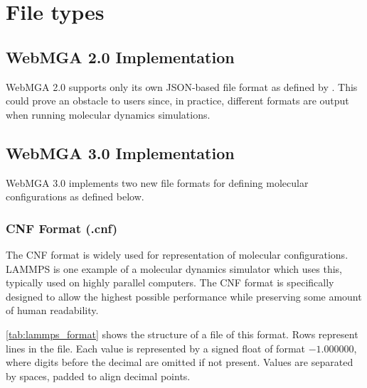 \section{File types}
\subsection{WebMGA 2.0 Implementation}
WebMGA 2.0 supports only its own JSON-based file format as defined by \citeauthor{Battistini_2021}. This could prove an obstacle to users since, in practice, different formats are output when running molecular dynamics simulations.

\subsection{WebMGA 3.0 Implementation}
WebMGA 3.0 implements two new file formats for defining molecular configurations as defined below.
\subsubsection{CNF Format (.cnf)}
The CNF format is widely used for representation of molecular configurations. LAMMPS is one example of a molecular dynamics simulator which uses this, typically used on highly parallel computers\cite{thompson2022lammps}. The CNF format is specifically designed to allow the highest possible performance while preserving some amount of human readability.

\cref{tab:lammps_format} shows the structure of a file of this format. Rows represent lines in the file. Each value is represented by a signed float of format $-1.000000 $, where digits before the decimal are omitted if not present. Values are separated by spaces, padded to align decimal points.

